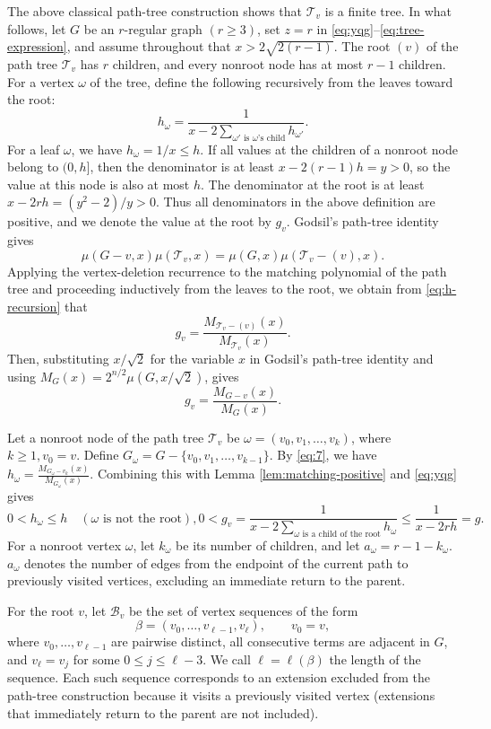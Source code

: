 \documentclass[11pt, a4paper]{article}
\begin{document}
The above classical path-tree construction shows that $\mathcal{T}_v$ is a finite tree.
In what follows, let $G$ be an $r$-regular graph $(r\geq3)$,
set $z=r$ in \eqref{eq:yqg}--\eqref{eq:tree-expression},
and assume throughout that $x>2\sqrt{2(r-1)}$.
The root $(v)$ of the path tree $\mathcal{T}_v$ has $r$ children,
and every nonroot node has at most $r-1$ children.
For a vertex $\omega$ of the tree, define the following recursively from the leaves toward the root:
\begin{equation}\label{eq:h-recursion}
 h_\omega=\frac1{x-2\sum_{\omega'\text{ is }\omega\text{'s child}}h_{\omega'}}.
\end{equation}
For a leaf $\omega$, we have $h_\omega=1/x\leq h$.
If all values at the children of a nonroot node belong to $(0,h]$, then the denominator is at least
$x-2(r-1)h=y>0$, so the value at this node is also at most $h$.
The denominator at the root is at least $x-2rh=(y^2-2)/y>0$.
Thus all denominators in the above definition are positive,
and we denote the value at the root by $g_v$.
Godsil's path-tree identity \cite{Godsil1981} gives
\[
\mu(G-v,x)\mu(\mathcal{T}_v,x)
=
\mu(G,x)\mu(\mathcal{T}_v-(v),x).
\]
Applying the vertex-deletion recurrence to the matching polynomial of the path tree and proceeding inductively from the leaves to the root,
we obtain from \eqref{eq:h-recursion} that
\[
g_v=\frac{M_{\mathcal{T}_v-(v)}(x)}{M_{\mathcal{T}_v}(x)}.
\]
Then, substituting $x/\sqrt2$ for the variable $x$ in Godsil's path-tree identity and using
$M_G(x)=2^{n/2}\mu(G,x/\sqrt2)$,
gives
\begin{equation}\label{eq:root-ratio}
 g_v=\frac{M_{G-v}(x)}{M_G(x)}.
\end{equation}

Let a nonroot node of the path tree $\mathcal{T}_v$ be
$\omega=(v_0,v_1,\ldots,v_k)$,
where $k\ge 1, v_0=v$.
Define
$G_\omega
=
G-\{v_0,v_1,\ldots,v_{k-1}\}$.
By \eqref{eq:7}, we have
$h_\omega = \frac{M_{G_\omega - v_k}(x)}{M_{G_\omega}(x)}$.
Combining this with Lemma \ref{lem:matching-positive} and \eqref{eq:yqg} gives
\[
 0<h_\omega\leq h\quad(\omega\text{ is not the root}),
 0<g_v
=\frac1{x-2\sum_{\omega\text{ is a child of the root}}h_\omega}
\le \frac1{x-2rh}=g.
\]
For a nonroot vertex $\omega$, let $k_\omega$ be its number of children, and let
$a_\omega=r-1-k_\omega$.
$a_\omega$ denotes the number of edges from the endpoint of the current path to previously visited vertices, excluding an immediate return to the parent.

For the root $v$, let $\mathcal{B}_v$ be the set of vertex sequences of the form
\begin{equation}\label{eq:blocked-definition}
 \beta=(v_0,\ldots,v_{\ell-1},v_\ell),
 \qquad v_0=v,
\end{equation}
where $v_0,\ldots,v_{\ell-1}$ are pairwise distinct, all consecutive terms are adjacent in $G$,
and $v_\ell=v_j$ for some $0\leq j\leq\ell-3$.
We call $\ell=\ell(\beta)$ the length of the sequence.
Each such sequence corresponds to an extension excluded from the path-tree construction because it visits a previously visited vertex
(extensions that immediately return to the parent are not included).
\end{document}
